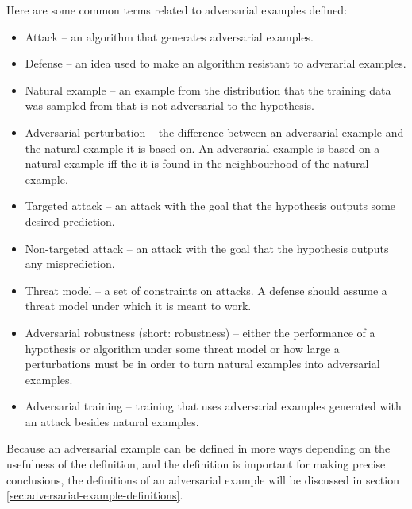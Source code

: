 \documentclass{article}
\begin{document}
Here are some common terms related to adversarial examples defined:
\begin{itemize}
	\item Attack -- an algorithm that generates adversarial examples.
	\item Defense -- an idea used to make an algorithm resistant to adverarial examples.
	\item Natural example -- an example from the distribution that the training data was sampled from that is not adversarial to the hypothesis.
	\item Adversarial perturbation -- the difference between an adversarial example and the natural example it is based on. An adversarial example is based on a natural example iff the it is found in the neighbourhood of the natural example.
	\item Targeted attack -- an attack with the goal that the hypothesis outputs some desired prediction.
	\item Non-targeted attack -- an attack with the goal that the hypothesis outputs any misprediction.
	\item Threat model -- a set of constraints on attacks. A defense should assume a threat model under which it is meant to work.
	\item Adversarial robustness (short: robustness) -- either the performance of a hypothesis or algorithm under some threat model or how large a perturbations must be in order to turn natural examples into adversarial examples.
	\item Adversarial training -- training that uses adversarial examples generated with an attack besides natural examples.
\end{itemize}
Because an adversarial example can be defined in more ways depending on the usefulness of the definition, and the definition is important for making precise conclusions, the definitions of an adversarial example will be discussed in section \ref{sec:adversarial-example-definitions}.
\end{document}
